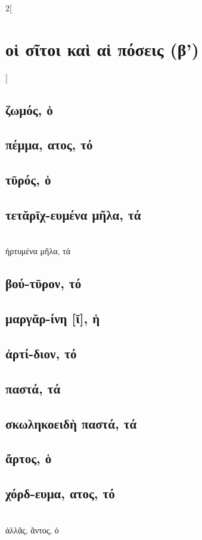 \documentclass{book}
\begin{document}
\begin{multicols}{2}[\section{οἱ σῖτοι καὶ αἱ πόσεις (β')}]
\subsection{ζωμός, ὁ}
\subsection{πέμμα, ατος, τό}
\subsection{τῡρός, ὁ}
\subsection{τετᾰρῑχ-ευμένα μῆλα, τά}
 ~\\
ἠρτυμένα μῆλα, τά 
\subsection{βού-τῡρον, τό}
\subsection{μαργᾰρ-ίνη [ῑ], ἡ}
\subsection{ἀρτί-διον, τό}
\subsection{παστά, τά}
\subsection{σκωληκοειδὴ παστά, τά}
\subsection{ἄρτος, ὁ}
\subsection{χόρδ-ευμα, ατος, τό}
 ~\\
ἀλλᾶς, ᾶντος, ὁ

\end{multicols}
\end{document}
